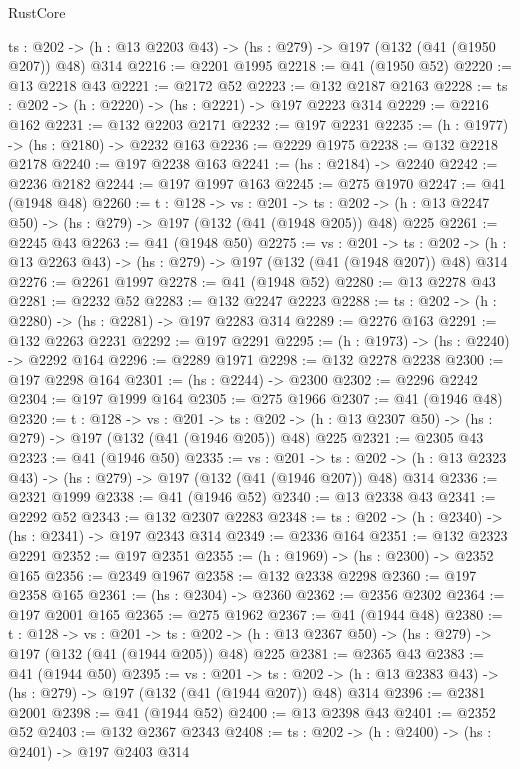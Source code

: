 \begin{lexlean}{RustCore}
\begin{coremodule}
  {ts : @202} -> (h : @13 @2203 @43) -> (hs : @279) -> @197 (@132 (@41 (@1950 @207)) @48) @314
@2216 := @2201 @1995
@2218 := @41 (@1950 @52)
@2220 := @13 @2218 @43
@2221 := @2172 @52
@2223 := @132 @2187 @2163
@2228 := {ts : @202} -> (h : @2220) -> (hs : @2221) -> @197 @2223 @314
@2229 := @2216 @162
@2231 := @132 @2203 @2171
@2232 := @197 @2231
@2235 := (h : @1977) -> (hs : @2180) -> @2232 @163
@2236 := @2229 @1975
@2238 := @132 @2218 @2178
@2240 := @197 @2238 @163
@2241 := (hs : @2184) -> @2240
@2242 := @2236 @2182
@2244 := @197 @1997 @163
@2245 := @275 @1970
@2247 := @41 (@1948 @48)
@2260 := {t : @128} ->
  {vs : @201} ->
  {ts : @202} -> (h : @13 @2247 @50) -> (hs : @279) -> @197 (@132 (@41 (@1948 @205)) @48) @225
@2261 := @2245 @43
@2263 := @41 (@1948 @50)
@2275 := {vs : @201} ->
  {ts : @202} -> (h : @13 @2263 @43) -> (hs : @279) -> @197 (@132 (@41 (@1948 @207)) @48) @314
@2276 := @2261 @1997
@2278 := @41 (@1948 @52)
@2280 := @13 @2278 @43
@2281 := @2232 @52
@2283 := @132 @2247 @2223
@2288 := {ts : @202} -> (h : @2280) -> (hs : @2281) -> @197 @2283 @314
@2289 := @2276 @163
@2291 := @132 @2263 @2231
@2292 := @197 @2291
@2295 := (h : @1973) -> (hs : @2240) -> @2292 @164
@2296 := @2289 @1971
@2298 := @132 @2278 @2238
@2300 := @197 @2298 @164
@2301 := (hs : @2244) -> @2300
@2302 := @2296 @2242
@2304 := @197 @1999 @164
@2305 := @275 @1966
@2307 := @41 (@1946 @48)
@2320 := {t : @128} ->
  {vs : @201} ->
  {ts : @202} -> (h : @13 @2307 @50) -> (hs : @279) -> @197 (@132 (@41 (@1946 @205)) @48) @225
@2321 := @2305 @43
@2323 := @41 (@1946 @50)
@2335 := {vs : @201} ->
  {ts : @202} -> (h : @13 @2323 @43) -> (hs : @279) -> @197 (@132 (@41 (@1946 @207)) @48) @314
@2336 := @2321 @1999
@2338 := @41 (@1946 @52)
@2340 := @13 @2338 @43
@2341 := @2292 @52
@2343 := @132 @2307 @2283
@2348 := {ts : @202} -> (h : @2340) -> (hs : @2341) -> @197 @2343 @314
@2349 := @2336 @164
@2351 := @132 @2323 @2291
@2352 := @197 @2351
@2355 := (h : @1969) -> (hs : @2300) -> @2352 @165
@2356 := @2349 @1967
@2358 := @132 @2338 @2298
@2360 := @197 @2358 @165
@2361 := (hs : @2304) -> @2360
@2362 := @2356 @2302
@2364 := @197 @2001 @165
@2365 := @275 @1962
@2367 := @41 (@1944 @48)
@2380 := {t : @128} ->
  {vs : @201} ->
  {ts : @202} -> (h : @13 @2367 @50) -> (hs : @279) -> @197 (@132 (@41 (@1944 @205)) @48) @225
@2381 := @2365 @43
@2383 := @41 (@1944 @50)
@2395 := {vs : @201} ->
  {ts : @202} -> (h : @13 @2383 @43) -> (hs : @279) -> @197 (@132 (@41 (@1944 @207)) @48) @314
@2396 := @2381 @2001
@2398 := @41 (@1944 @52)
@2400 := @13 @2398 @43
@2401 := @2352 @52
@2403 := @132 @2367 @2343
@2408 := {ts : @202} -> (h : @2400) -> (hs : @2401) -> @197 @2403 @314

\end{coremodule}
\end{lexlean}
